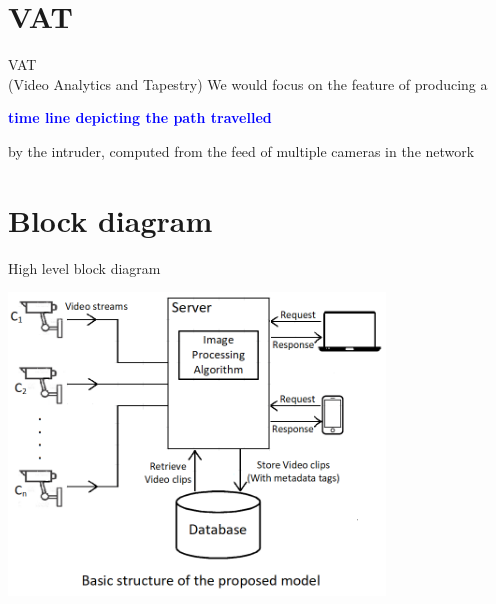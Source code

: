 \documentclass{beamer}
\begin{document}

\section{VAT}
\begin{frame}{VAT \\ (Video Analytics and Tapestry)}
  We would focus on the feature of producing a
  \begin{center}
    \textbf{\textcolor{blue}{\Large{time line depicting the path travelled}}}
  \end{center}
  by the intruder, computed from the feed of multiple cameras in the network
\end{frame}


\section{Block diagram}
\begin{frame}{High level block diagram}
  \begin{center}
    \includegraphics[width=10cm,keepaspectratio]{HighLevelBlockDiagram.png}
  \end{center}
\end{frame}

\end{document}
